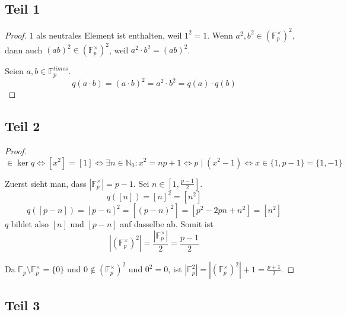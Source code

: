 \documentclass[10pt,a4paper]{article}
\begin{document}
\subsection{Teil 1}

\begin{proof}
  $1$ als neutrales Element ist enthalten, weil $1^{2} = 1$.
  Wenn $a^{2}, b^{2} \in (\mathbb{F}_{p}^{\times})^{2}$, dann auch $(ab)^{2} \in (\mathbb{F}_{p}^{\times})^{2}$, weil $a^{2} \cdot b^{2} = (ab)^{2}$.

  Seien $a, b \in \mathbb{F}_{p}^{times}$.
  \begin{equation}
    q(a \cdot b) = (a \cdot b)^{2} = a^{2} \cdot b^{2} = q(a) \cdot q(b)
  \end{equation}
\end{proof}

\subsection{Teil 2}

\begin{proof}
  \begin{equation}
    [x] \in \ker q \Leftrightarrow [x^{2}] = [1] \Leftrightarrow \exists n \in \mathbb{N}_{0} : x^{2} = np + 1 \Leftrightarrow p \mid (x^{2} - 1) \Leftrightarrow x \in \{ 1, p - 1 \} = \{ 1, -1 \}
  \end{equation}

  Zuerst sieht man, dass $|\mathbb{F}_{p}^{\times}| = p - 1$.
  Sei $n \in [1, \frac{p - 1}{2}]$.
  \begin{equation}
    q([n]) = [n]^{2} = [n^{2}]
  \end{equation}
  \begin{equation}
    q([p - n]) = [p - n]^{2} = [(p - n)^{2}] = [p^{2} - 2pn + n^{2}] = [n^{2}]
  \end{equation}
  $q$ bildet also $[n]$ und $[p - n]$ auf dasselbe ab.
  Somit ist
  \begin{equation}
    |(\mathbb{F}_{p}^{\times})^{2}| = \frac{|\mathbb{F}_{p}^{\times}|}{2} = \frac{p - 1}{2}
  \end{equation}

  Da $\mathbb{F}_{p} \setminus \mathbb{F}_{p}^{\times} = \{ 0 \}$ und $0 \not\in (\mathbb{F}_{p}^{\times})^{2}$ und $0^{2} = 0$, ist $|\mathbb{F}_{p}^{2}| = |(\mathbb{F}_{p}^{\times})^{2}| + 1 = \frac{p + 1}{2}$.
\end{proof}

\subsection{Teil 3}
\end{document}
